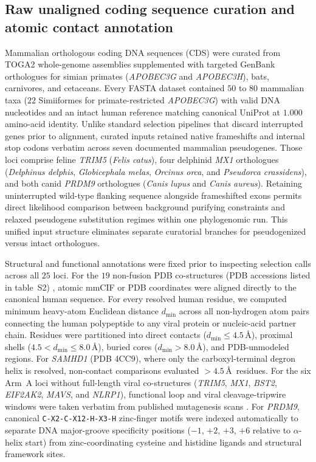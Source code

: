 \documentclass[12pt]{article}
\begin{document}
\subsection*{Raw unaligned coding sequence curation and atomic contact annotation}

Mammalian orthologous coding DNA sequences (CDS) were curated from TOGA2 whole-genome assemblies \cite{kirilenko2023integrating} supplemented with targeted GenBank orthologues for simian primates (\textit{APOBEC3G} and \textit{APOBEC3H}), bats, carnivores, and cetaceans. Every FASTA dataset contained $50$ to $80$ mammalian taxa ($22$ Simiiformes for primate-restricted \textit{APOBEC3G}) with valid DNA nucleotides and an intact human reference matching canonical UniProt at $1.000$ amino-acid identity. Unlike standard selection pipelines that discard interrupted genes prior to alignment, curated inputs retained native frameshifts and internal stop codons verbatim across seven documented mammalian pseudogenes. Those loci comprise feline \textit{TRIM5} (\textit{Felis catus}), four delphinid \textit{MX1} orthologues (\textit{Delphinus delphis}, \textit{Globicephala melas}, \textit{Orcinus orca}, and \textit{Pseudorca crassidens}), and both canid \textit{PRDM9} orthologues (\textit{Canis lupus} and \textit{Canis aureus}). Retaining uninterrupted wild-type flanking sequence alongside frameshifted exons permits direct likelihood comparison between background purifying constraints and relaxed pseudogene substitution regimes within one phylogenomic run. This unified input structure eliminates separate curatorial branches for pseudogenized versus intact orthologues.

Structural and functional annotations were fixed prior to inspecting selection calls across all $25$ loci. For the $19$ non-fusion PDB co-structures (PDB accessions listed in table~S2) \cite{schwefel2014samhd1,li2023vif,abraham2010structure,kwong1998structure,ng2015filovirus}, atomic mmCIF or PDB coordinates were aligned directly to the canonical human sequence. For every resolved human residue, we computed minimum heavy-atom Euclidean distance $d_{\min}$ across all non-hydrogen atom pairs connecting the human polypeptide to any viral protein or nucleic-acid partner chain. Residues were partitioned into direct contacts ($d_{\min} \le 4.5$\,\AA), proximal shells ($4.5 < d_{\min} \le 8.0$\,\AA), buried cores ($d_{\min} > 8.0$\,\AA), and PDB-unmodeled regions. For \textit{SAMHD1} (PDB 4CC9), where only the carboxyl-terminal degron helix is resolved, non-contact comparisons evaluated $>4.5$\,\AA\ residues. For the six Arm~A loci without full-length viral co-structures (\textit{TRIM5}, \textit{MX1}, \textit{BST2}, \textit{EIF2AK2}, \textit{MAVS}, and \textit{NLRP1}), functional loop and viral cleavage-tripwire windows were taken verbatim from published mutagenesis scans \cite{tenthorey2020mutational,mitchell2012evolution,mcnatt2009species,elde2009protein,patel2012antagonism,tsu2021diverse}. For \textit{PRDM9}, canonical \texttt{C-X2-C-X12-H-X3-H} zinc-finger motifs were indexed automatically to separate DNA major-groove specificity positions ($-1$, $+2$, $+3$, $+6$ relative to $\alpha$-helix start) from zinc-coordinating cysteine and histidine ligands and structural framework sites.
\end{document}
